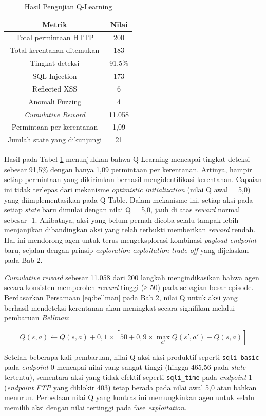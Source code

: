\begin{table}[H]
\centering
\caption{Hasil Pengujian Q-Learning}
\label{tab:ql_results}
\begin{tabular}{|c|c|}
\hline
\textbf{Metrik} & \textbf{Nilai} \\
\hline
Total permintaan HTTP & 200 \\
Total kerentanan ditemukan & 183 \\
Tingkat deteksi & 91,5\% \\
SQL Injection & 173 \\
Reflected XSS & 6 \\
Anomali Fuzzing & 4 \\
\textit{Cumulative Reward} & 11.058 \\
Permintaan per kerentanan & 1,09 \\
Jumlah state yang dikunjungi & 21 \\
\hline
\end{tabular}
\end{table}

Hasil pada Tabel \ref{tab:ql_results} menunjukkan bahwa Q-Learning mencapai tingkat deteksi sebesar 91,5\% dengan hanya 1,09 permintaan per kerentanan. Artinya, hampir setiap permintaan yang dikirimkan berhasil mengidentifikasi kerentanan. Capaian ini tidak terlepas dari mekanisme \textit{optimistic initialization} (nilai Q awal = 5,0) yang diimplementasikan pada Q-Table. Dalam mekanisme ini, setiap aksi pada setiap \textit{state} baru dimulai dengan nilai Q = 5,0, jauh di atas \textit{reward} normal sebesar -1. Akibatnya, aksi yang belum pernah dicoba selalu tampak lebih menjanjikan dibandingkan aksi yang telah terbukti memberikan \textit{reward} rendah. Hal ini mendorong agen untuk terus mengeksplorasi kombinasi \textit{payload-endpoint} baru, sejalan dengan prinsip \textit{exploration-exploitation trade-off} yang dijelaskan pada Bab 2.

\textit{Cumulative reward} sebesar 11.058 dari 200 langkah mengindikasikan bahwa agen secara konsisten memperoleh \textit{reward} tinggi (≥ 50) pada sebagian besar episode. Berdasarkan Persamaan \ref{eq:bellman} pada Bab 2, nilai Q untuk aksi yang berhasil mendeteksi kerentanan akan meningkat secara signifikan melalui pembaruan \textit{Bellman}:

\[
Q(s, a) \leftarrow Q(s, a) + 0,1 \times [50 + 0,9 \times \max_{a'} Q(s', a') - Q(s, a)]
\]

Setelah beberapa kali pembaruan, nilai Q aksi-aksi produktif seperti \texttt{sqli\_basic} pada \textit{endpoint} 0 mencapai nilai yang sangat tinggi (hingga 465,56 pada \textit{state} tertentu), sementara aksi yang tidak efektif seperti \texttt{sqli\_time} pada \textit{endpoint} 1 (\textit{endpoint FTP} yang diblokir 403) tetap berada pada nilai awal 5,0 atau bahkan menurun. Perbedaan nilai Q yang kontras ini memungkinkan agen untuk selalu memilih aksi dengan nilai tertinggi pada fase \textit{exploitation}.

